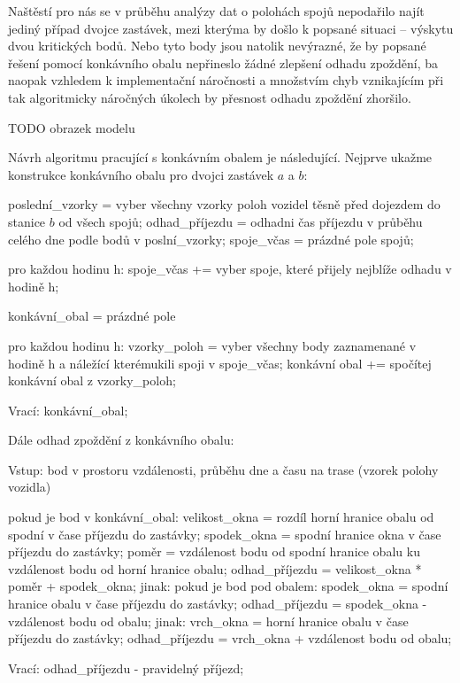 \bigbreak

Naštěstí pro nás se v průběhu analýzy dat o polohách spojů nepodařilo najít jediný případ dvojce zastávek, mezi kterýma by došlo k popsané situaci -- výskytu dvou kritických bodů. Nebo tyto body jsou natolik nevýrazné, že by popsané řešení pomocí konkávního obalu nepřineslo žádné zlepšení odhadu zpoždění, ba naopak vzhledem k implementační náročnosti a množstvím chyb vznikajícím při tak algoritmicky náročných úkolech by přesnost odhadu zpoždění zhoršilo.

TODO obrazek modelu

\bigbreak

Návrh algoritmu pracující s konkávním obalem je následující. Nejprve ukažme konstrukce konkávního obalu pro dvojci zastávek $a$ a $b$:

\begin{code}[frame=none]
poslední_vzorky = vyber všechny vzorky poloh vozidel
  těsně před dojezdem do stanice $b$ od všech spojů;
odhad_příjezdu = odhadni čas příjezdu v průběhu celého
  dne podle bodů v poslní_vzorky;
spoje_včas = prázdné pole spojů;

pro každou hodinu h:
  spoje_včas += vyber spoje, které přijely nejblíže
    odhadu v hodině h;

konkávní_obal = prázdné pole

pro každou hodinu h:
  vzorky_poloh = vyber všechny body zaznamenané
    v hodině h a náležící kterémukili spoji v spoje_včas;
  konkávní obal += spočítej konkávní obal z vzorky_poloh;

Vrací: konkávní_obal;
\end{code}

Dále odhad zpoždění z konkávního obalu:

\begin{code}[frame=none]
Vstup: bod v prostoru vzdálenosti, průběhu dne
  a času na trase (vzorek polohy vozidla)

pokud je bod v konkávní_obal:
  velikost_okna = rozdíl horní hranice obalu od spodní
    v čase příjezdu do zastávky;
  spodek_okna = spodní hranice okna v čase
    příjezdu do zastávky;
  poměr = vzdálenost bodu od spodní hranice obalu
	ku vzdálenost bodu od horní hranice obalu;
  odhad_příjezdu = velikost_okna * poměr + spodek_okna;
jinak:
  pokud je bod pod obalem:
    spodek_okna = spodní hranice obalu
	  v čase příjezdu do zastávky;
    odhad_příjezdu = spodek_okna - vzdálenost bodu od obalu;
  jinak:
    vrch_okna = horní hranice obalu
	  v čase příjezdu do zastávky;
    odhad_příjezdu = vrch_okna + vzdálenost bodu od obalu;

Vrací: odhad_příjezdu - pravidelný příjezd;
\end{code}

